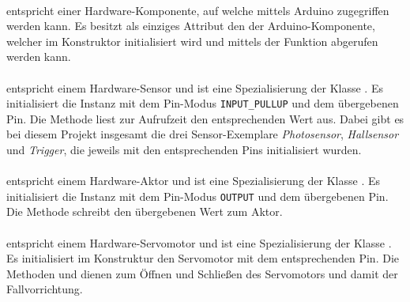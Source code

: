\paragraph{} entspricht einer Hardware-Komponente, auf welche mittels Arduino zugegriffen werden kann.
Es besitzt als einziges Attribut den  der Arduino-Komponente, welcher im Konstruktor initialisiert wird und mittels der Funktion  abgerufen werden kann.

\paragraph{} entspricht einem Hardware-Sensor und ist eine Spezialisierung der Klasse . 
Es initialisiert die Instanz mit dem Pin-Modus \texttt{INPUT\_PULLUP} und dem übergebenen Pin.
Die Methode  liest zur Aufrufzeit den entsprechenden Wert aus.
Dabei gibt es bei diesem Projekt insgesamt die drei Sensor-Exemplare \textit{Photosensor}, \textit{Hallsensor} und \textit{Trigger}, die jeweils mit den entsprechenden Pins initialisiert wurden. 

\paragraph{} entspricht einem Hardware-Aktor und ist eine Spezialisierung der Klasse .
Es initialisiert die Instanz mit dem Pin-Modus \texttt{OUTPUT} und dem übergebenen Pin.
Die Methode  schreibt den übergebenen Wert zum Aktor.

\paragraph{} entspricht einem Hardware-Servomotor und ist eine Spezialisierung der Klasse .
Es initialisiert im Konstruktur den Servomotor mit dem entsprechenden Pin.
Die Methoden  und  dienen zum Öffnen und Schließen des Servomotors und damit der Fallvorrichtung.


